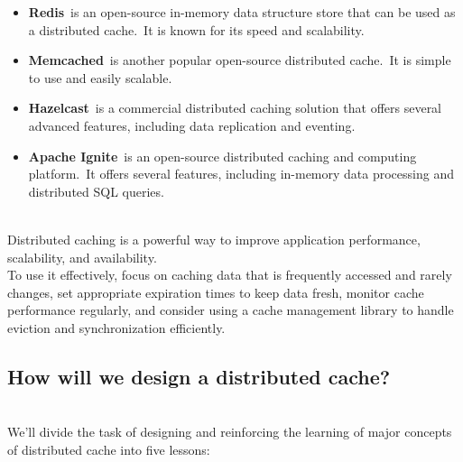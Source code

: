 \begin{itemize}
\item
\protect{}\label{wXLzK60-AeQ3BV16PdSMl}
\textbf{Redis}~is an open-source in-memory data structure store that can be used as a distributed cache.~It is known for its speed and scalability.
\item
\protect{}\label{QrO12Kfq60m5z0fwbKJYm}
\textbf{Memcached}~is another popular open-source distributed cache.~It is simple to use and easily scalable.
\item
\protect{}\label{c3KoL7xH2LlrxkXRaz7AR}
\textbf{Hazelcast}~is a commercial distributed caching solution that offers several advanced features, including data replication and eventing.
\item
\protect{}\label{RqUI_ZXg-QgUPlBvWzYc7}
\textbf{Apache Ignite}~is an open-source distributed caching and computing platform.~It offers several features, including in-memory data processing and distributed SQL queries.
\end{itemize}
\\
Distributed caching is a powerful way to improve application performance, scalability, and availability.
\\
To use it effectively, focus on caching data that is frequently accessed and rarely changes, set appropriate expiration times to keep data fresh, monitor cache performance regularly, and consider using a cache management library to handle eviction and synchronization efficiently.

\subsection{How will we design a distributed cache?}\label{PurZWEmv5LUAmAwFKh0oK}
\\
We'll divide the task of designing and reinforcing the learning of major concepts of distributed cache into five lessons:


